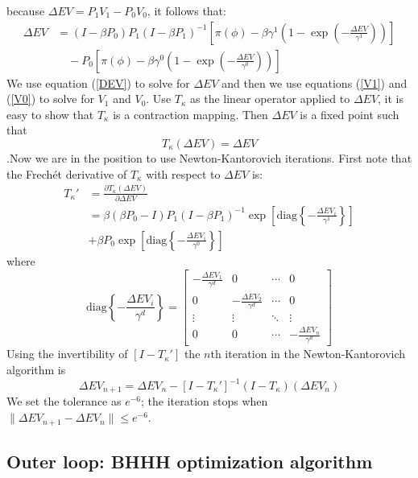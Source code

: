  because $\Delta EV=P_{1}V_{1}-P_{0}V_{0}$, it follows that:
\begin{align}
\Delta EV & =\left(I-\beta P_{0}\right)P_{1}\left(I-\beta P_{1}\right)^{-1}\left[\pi\left(\phi\right)-\beta\gamma^{1}\left(1-\exp\left(-\frac{\Delta EV}{\gamma^{1}}\right)\right)\right]\label{DEV}\\
 & \quad-P_{0}\left[\pi\left(\phi\right)-\beta\gamma^{0}\left(1-\exp\left(-\frac{\Delta EV}{\gamma^{0}}\right)\right)\right]\nonumber 
\end{align}
We use equation (\ref{DEV}) to solve for $\Delta EV$ and then we
use equations (\ref{V1}) and (\ref{V0}) to solve for $V_{1}$ and
$V_{0}$. Use $T_{\kappa}$ as the linear operator applied to $\Delta EV$,
it is easy to show that $T_{\kappa}$ is a contraction mapping. Then
$\Delta EV$ is a fixed point such that 
\[
T_{\kappa}\left(\Delta EV\right)=\Delta EV
\]
.Now we are in the position to use Newton-Kantorovich iterations.
First note that the Frech\'{e}t derivative of $T_{\kappa}$ with
respect to $\Delta EV$ is:
\begin{align}
T_{\kappa}' & =\frac{\partial T_{\kappa}\left(\Delta EV\right)}{\partial\Delta EV}\\
 & =\beta\left(\beta P_{0}-I\right)P_{1}\left(I-\beta P_{1}\right)^{-1}\exp\left[\text{diag}\left\{ -\frac{\Delta EV_{i}}{\gamma^{1}}\right\} \right]\nonumber \\
 & +\beta P_{0}\exp\left[\text{diag}\left\{ -\frac{\Delta EV_{i}}{\gamma^{0}}\right\} \right]\nonumber 
\end{align}
where 
\[
\text{diag}\left\{ -\frac{\Delta EV_{i}}{\gamma^{d}}\right\} =\left[\begin{array}{cccc}
-\frac{\Delta EV_{1}}{\gamma^{d}} & 0 & \cdots & 0\\
0 & -\frac{\Delta EV_{2}}{\gamma^{d}} & \cdots & 0\\
\vdots & \vdots & \ddots & \vdots\\
0 & 0 & \cdots & -\frac{\Delta EV_{n}}{\gamma^{d}}
\end{array}\right]
\]
Using the invertibility of $\left[I-T_{\kappa}'\right]$ the $n$th
iteration in the Newton-Kantorovich algorithm is 
\[
\Delta EV_{n+1}=\Delta EV_{n}-\left[I-T_{\kappa}'\right]^{-1}\left(I-T_{\kappa}\right)\left(\Delta EV_{n}\right)
\]
We set the tolerance as $e^{-6}$; the iteration stops when $\|\Delta EV_{n+1}-\Delta EV_{n}\|\leq e^{-6}$. 

\subsection{Outer loop: BHHH optimization algorithm}

